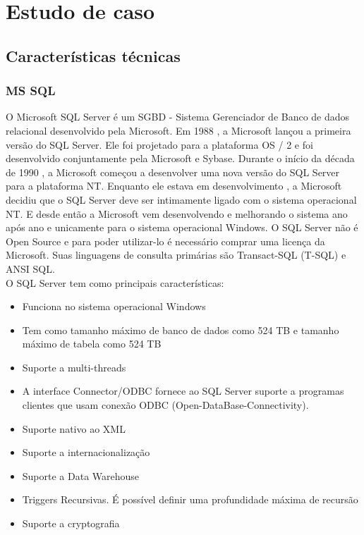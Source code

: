 \documentclass[conference]{IEEEtran}
\begin{document}
\section{Estudo de caso}
  \subsection{Características técnicas}
    \subsubsection{MS SQL}
    O Microsoft SQL Server é um SGBD - Sistema Gerenciador de Banco de dados relacional desenvolvido pela Microsoft. Em 1988 , a Microsoft lançou a primeira versão do SQL Server. Ele foi projetado para a plataforma OS / 2 e foi desenvolvido conjuntamente pela Microsoft e Sybase. Durante o início da década de 1990 , a Microsoft começou a desenvolver uma nova versão do SQL Server para a plataforma NT. Enquanto ele estava em desenvolvimento , a Microsoft decidiu que o SQL Server deve ser intimamente ligado com o sistema operacional NT. E desde então a Microsoft vem desenvolvendo e melhorando o sistema ano após ano e unicamente para o sistema operacional Windows. O SQL Server não é Open Source e para poder utilizar-lo é necessário comprar uma licença da Microsoft. Suas linguagens de consulta primárias são Transact-SQL (T-SQL) e ANSI SQL.\cite{sql-server-site} \cite{sql-server-site2}\\
    
    O SQL Server tem como principais características:
    \begin{itemize}
      \item Funciona no sistema operacional Windows
      \item Tem como tamanho máximo de banco de dados como 524 TB  e tamanho máximo de tabela como 524 TB
      \item Suporte a multi-threads
      \item A interface Connector/ODBC fornece ao SQL Server suporte a programas clientes que usam conexão ODBC (Open-DataBase-Connectivity).
      \item Suporte nativo ao XML
      \item Suporte a internacionalização
      \item Suporte a Data Warehouse
      \item Triggers Recursivas. É possível definir uma profundidade máxima de recursão
      \item Suporte a cryptografia
    \end{itemize}
\end{document}
